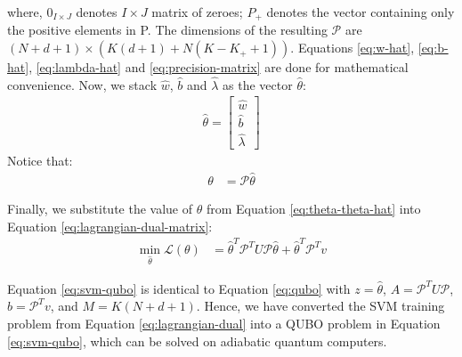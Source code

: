 \documentclass[12pt]{article}
\numberwithin{equation}{section}
\begin{document}
where,
$0_{I \times J}$ denotes $I \times J$ matrix of zeroes;
$P_+$ denotes the vector containing only the positive elements in P.
The dimensions of the resulting $\mathcal{P}$ are $(N + d + 1) \times (K(d + 1) + N (K - K_+ + 1))$.
Equations \ref{eq:w-hat}, \ref{eq:b-hat}, \ref{eq:lambda-hat} and \ref{eq:precision-matrix} are done for mathematical convenience.
Now, we stack $\hat{w}$, $\hat{b}$ and $\hat{\lambda}$ as the vector $\hat{\theta}$:
\begin{align}
    \hat{\theta} =  \begin{bmatrix}
                        \hat{w} \\ \hat{b} \\ \hat{\lambda}
                    \end{bmatrix} \label{eq:theta-hat}
\end{align}
Notice that:
\begin{align}
    \theta &= \mathcal{P} \hat{\theta} \label{eq:theta-theta-hat}
\end{align}

Finally, we substitute the value of $\theta$ from Equation \ref{eq:theta-theta-hat} into Equation \ref{eq:lagrangian-dual-matrix}:
\begin{align}
    \min_{\hat{\theta}} \mathcal{L} (\theta) &= \hat{\theta}^T \mathcal{P}^T U \mathcal{P} \hat{\theta} + \hat{\theta}^T  \mathcal{P}^T v \label{eq:svm-qubo}
\end{align}

Equation \ref{eq:svm-qubo} is identical to Equation \ref{eq:qubo} with $z = \hat{\theta}$, $A = \mathcal{P}^T U \mathcal{P}$, $b = \mathcal{P}^T v$, and $M = K (N + d + 1)$.
Hence, we have converted the SVM training problem from Equation \ref{eq:lagrangian-dual} into a QUBO problem in Equation \ref{eq:svm-qubo}, which can be solved on adiabatic quantum computers.
\end{document}
